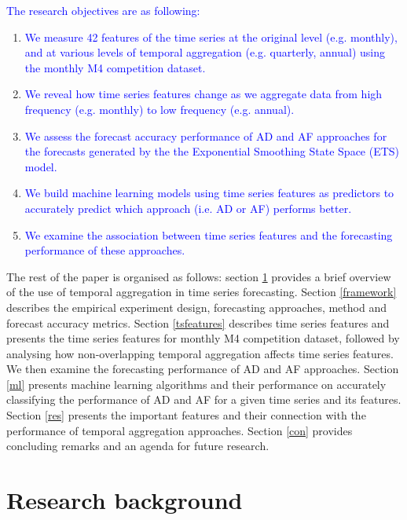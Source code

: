 \documentclass[preprint, 3p,
authoryear]{elsarticle} %
\begin{document}
\textcolor{blue}{The research objectives are as following:}

\begin{enumerate}
\def\labelenumi{\arabic{enumi}.}
\item
  \textcolor{blue}{We measure 42 features of the time series at the original level (e.g. monthly), and at various levels of temporal aggregation (e.g. quarterly, annual) using the monthly M4 competition dataset.}
\item
  \textcolor{blue}{We reveal how time series features change as we aggregate data from high frequency (e.g. monthly) to low frequency (e.g. annual).}
\item
  \textcolor{blue}{We assess the forecast accuracy performance of AD and AF approaches for the forecasts generated by the the Exponential Smoothing State Space (ETS) model.}
\item
  \textcolor{blue}{We build machine learning models using time series features as predictors to accurately predict which approach (i.e. AD or AF) performs better.}
\item
  \textcolor{blue}{We examine the association between time series features and the forecasting performance of these approaches.}
\end{enumerate}

The rest of the paper is organised as follows: section \ref{lit}
provides a brief overview of the use of temporal aggregation in time
series forecasting. Section \ref{framework} describes the empirical
experiment design, forecasting approaches, method and forecast accuracy
metrics. Section \ref{tsfeatures} describes time series features and
presents the time series features for monthly M4 competition dataset,
followed by analysing how non-overlapping temporal aggregation affects
time series features. We then examine the forecasting performance of AD
and AF approaches. Section \ref{ml} presents machine learning algorithms
and their performance on accurately classifying the performance of AD
and AF for a given time series and its features. Section \ref{res}
presents the important features and their connection with the
performance of temporal aggregation approaches. Section \ref{con}
provides concluding remarks and an agenda for future research.

\hypertarget{lit}{%
\section{Research background}\label{lit}}
\end{document}
